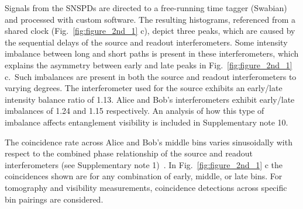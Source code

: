 \documentclass[11pt]{caltech_thesis} %
\begin{document}
Signals from the SNSPDs are directed to a free-running time tagger (Swabian) and processed with custom software. The resulting histograms, referenced from a shared clock (Fig.~\ref{fig:figure_2nd_1} c), depict three peaks, which are caused by the sequential delays of the source and readout interferometers. Some intensity imbalance between long and short paths is present in these interferometers, which explains the asymmetry between early and late peaks in Fig.~\ref{fig:figure_2nd_1} c.~Such imbalances are present in both the source and readout interferometers to varying degrees. The interferometer used for the source exhibits an early/late intensity balance ratio of 1.13. Alice and Bob's interferometers exhibit early/late imbalances of 1.24 and 1.15 respectively. An analysis of how this type of imbalance affects entanglement visibility is included in Supplementary note 10.

The coincidence rate across Alice and Bob's middle bins varies sinusoidally with respect to the combined phase relationship of the source and readout interferometers (see Supplementary note 1)~\autocite{Inagaki2013,Marcikic2002}. In Fig.~\ref{fig:figure_2nd_1} c the coincidences shown are for any combination of early, middle, or late bins. For tomography and visibility measurements, coincidence detections across specific bin pairings are considered.
\end{document}
